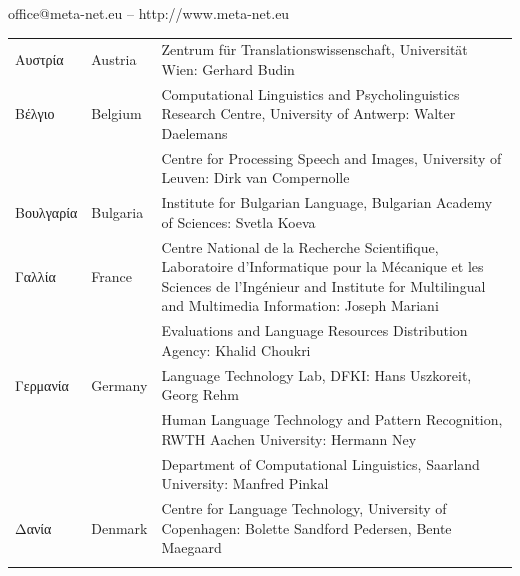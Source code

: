 \documentclass[]{../../metanetpaper}
\begin{document}
\vfill
\centerline{office@meta-net.eu -- http://www.meta-net.eu}

\cleardoublepage


\appendix
{}



  
\cleardoublepage

\label{metanetmembers}

\small
\begin{longtable}{@{}llp{113mm}@{}}
  Αυστρία & \textcolor{grey1}{Austria} & Zentrum für Translationswissenschaft, Universität Wien: Gerhard Budin\\ \addlinespace 
  Βέλγιο & \textcolor{grey1}{Belgium} & Computational Linguistics and Psycholinguistics Research Centre, University of Antwerp: Walter Daelemans\\ \addlinespace
  & & Centre for Processing Speech and Images, University of Leuven: Dirk van Compernolle \\ \addlinespace
  Βουλγαρία & \textcolor{grey1}{Bulgaria} & Institute for Bulgarian Language, Bulgarian Academy of Sciences: Svetla Koeva \\ \addlinespace
  Γαλλία & \textcolor{grey1}{France} & Centre National de la Recherche Scientifique, Laboratoire d'Informatique pour la Mécanique et les Sciences de l'Ingénieur and Institute for Multilingual and Multimedia Information: Joseph Mariani \\ \addlinespace
  & & Evaluations and Language Resources Distribution Agency: Khalid Choukri\\ \addlinespace 
  Γερμανία & \textcolor{grey1}{Germany} & Language Technology Lab, DFKI: Hans Uszkoreit, Georg Rehm\\ \addlinespace
  & & Human Language Technology and Pattern Recognition, RWTH Aachen University: Hermann Ney \\ \addlinespace
  & & Department of Computational Linguistics, Saarland University: Manfred Pinkal\\ \addlinespace Δανία &  \textcolor{grey1}{Denmark} & Centre for Language Technology, University of Copenhagen: \newline Bolette Sandford Pedersen, Bente Maegaard\\ \addlinespace

\end{longtable}
\end{document}
